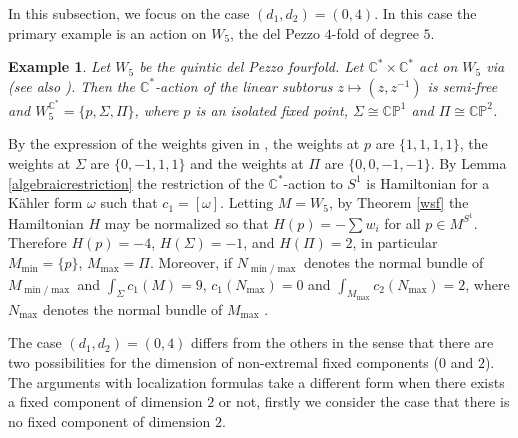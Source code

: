 \documentclass[12pt]{article}
\newtheorem{example}[theorem]{Example}
\begin{document}
In this subsection, we focus on the case $(d_1,d_2) = (0,4)$. In this case the primary example is an action on $W_5$, the del Pezzo $4$-fold of degree $5$.
\begin{example} \label{Wexample}
Let $W_5$ be the quintic del Pezzo fourfold. Let $\mathbb{C}^* \times \mathbb{C}^*$ act on $W_5$ via \cite[Theorem 5.2]{GLS} (see also \cite{PZ1}). Then the $\mathbb{C}^*$-action of the linear subtorus $z \mapsto (z,z^{-1})$ is semi-free and $W_{5}^{\mathbb{C}^*} = \{p,\Sigma,\Pi \}$,  where $p$ is an isolated fixed point,  $\Sigma \cong \mathbb{CP}^1$ and $\Pi \cong \mathbb{CP}^2$. 
\end{example}
By the expression of the weights given in \cite[Theorem 5.2]{GLS}, the weights at $p$ are $\{1,1,1,1\}$, the weights at $\Sigma$ are $\{0,-1,1,1\}$ and the weights at $\Pi $ are $\{0,0,-1,-1\}$. By Lemma  \ref{algebraicrestriction} the restriction of the $\mathbb{C}^*$-action to $S^1$ is Hamiltonian for a K\"{a}hler form $\omega$ such that $c_1 = [\omega]$. Letting $M=W_5$, by Theorem \ref{wsf} the Hamiltonian $H$ may be normalized so that $H(p) =- \sum w_i$ for all $p \in M^{S^1}$.  Therefore $H(p)=-4$, $H(\Sigma) = -1$, and $H(\Pi) = 2$, in particular $M_{\min} = \{p\}$, $M_{\max}= \Pi$. Moreover, if $N_{\min/\max}$ denotes the normal bundle of $M_{\min/\max}$ and $\int_{\Sigma} c_{1}(M)=9$, $c_{1}(N_{\max})=0$ and $\int_{M_{\max}} c_{2}(N_{\max})=2$, where $N_{\max}$ denotes the normal bundle of $M_{\max}$ \cite[Lemma 3.6]{PZ1}.

The case $(d_1,d_2) = (0,4)$ differs from the others in the sense that there are two possibilities for the dimension of non-extremal fixed components ($0$ and $2$). The arguments with localization formulas take a different form when there exists a fixed component of dimension $2$ or not, firstly we consider the case that there is no fixed component of dimension $2$. 
\end{document}

